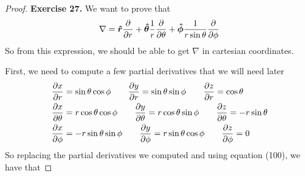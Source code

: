 \documentclass[11pt]{article}
\newcommand{\hatr}{\bm{\hat{r}}}
\newcommand{\hatphi}{\bm{\hat{\phi}}}
\newcommand{\hattheta}{\bm{\hat{\theta}}}
\theoremstyle{definition}
\begin{document}
\begin{proof}{\textbf{Exercise 27.}}
    We want to prove that
    $$\nabla = \hatr \partialderivative{}{r}
    + \hattheta \frac{1}{r}\partialderivative{}{\theta}
    + \hatphi \frac{1}{r\sin\theta}\partialderivative{}{\phi}$$
    So from this expression, we should be able to get $\nabla$
    in cartesian coordinates.

    First, we need to compute a few partial derivatives that we will need later
    \begin{align*}
        \partialderivative{x}{r} &= \sin\theta\cos\phi \quad\quad
        \partialderivative{y}{r} = \sin\theta\sin\phi \quad\quad
        \partialderivative{z}{r} = \cos\theta \quad\quad
        \\
        \partialderivative{x}{\theta} &= r\cos\theta\cos\phi\quad\quad
        \partialderivative{y}{\theta} = r\cos\theta\sin\phi\quad\quad
        \partialderivative{z}{\theta} = -r\sin\theta
        \\
        \partialderivative{x}{\phi} &= -r\sin\theta\sin\phi\quad\quad
        \partialderivative{y}{\phi} = r\sin\theta\cos\phi\quad\quad
        \partialderivative{z}{\phi} = 0
    \end{align*}
    So replacing the partial derivatives we computed and using equation (100),
    we have that


\end{proof}
\end{document}

